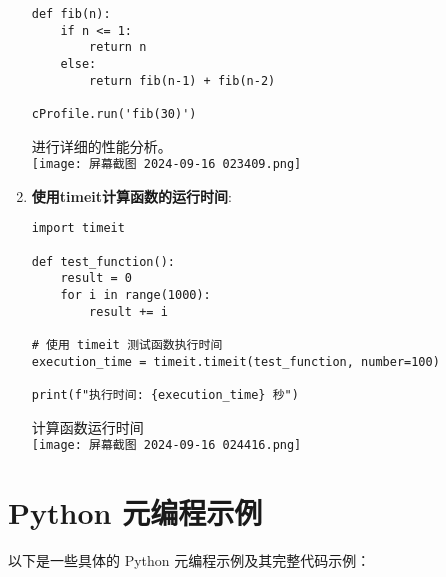\documentclass{ctexart}
\begin{document}
\begin{enumerate}[label=\arabic*.]
\begin{lstlisting}
def fib(n):
    if n <= 1:
        return n
    else:
        return fib(n-1) + fib(n-2)

cProfile.run('fib(30)')
\end{lstlisting}
进行详细的性能分析。\\
\texttt{[image: 屏幕截图 2024-09-16 023409.png]}
\item \textbf{使用timeit计算函数的运行时间}:
\begin{lstlisting}
import timeit

def test_function():
    result = 0
    for i in range(1000):
        result += i

# 使用 timeit 测试函数执行时间
execution_time = timeit.timeit(test_function, number=100)

print(f"执行时间: {execution_time} 秒")
\end{lstlisting}
计算函数运行时间\\
\texttt{[image: 屏幕截图 2024-09-16 024416.png]}
\end{enumerate}

\section{Python 元编程示例}

以下是一些具体的 Python 元编程示例及其完整代码示例：
\end{document}
